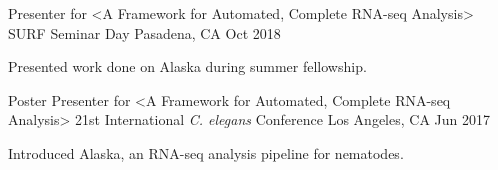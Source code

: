 

\begin{cventries}


  \cventry
    {Presenter for <A Framework for Automated, Complete RNA-seq Analysis>} %
    {SURF Seminar Day} %
    {Pasadena, CA} %
    {Oct 2018} %
    {
      \begin{cvitems} %
        \item {Presented work done on Alaska during summer fellowship.}
      \end{cvitems}
    }


  \cventry
    {Poster Presenter for <A Framework for Automated, Complete RNA-seq Analysis>} %
    {21st International \textit{C. elegans} Conference} %
    {Los Angeles, CA} %
    {Jun 2017} %
    {
      \begin{cvitems} %
        \item {Introduced Alaska, an RNA-seq analysis pipeline for nematodes.}
      \end{cvitems}
    }

\end{cventries}
